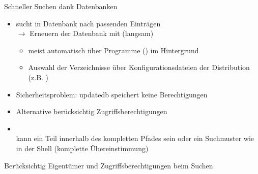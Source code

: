\documentclass[aspectratio=43]{beamer}
\begin{document}
\begin{frame}{Schneller Suchen dank Datenbanken}
  \begin{block}{}
    \begin{itemize}
      \item sucht in Datenbank nach passenden Einträgen\\
        $\rightarrow$ Erneuern der Datenbank mit  (langsam)
        \begin{itemize}
          \item meist automatisch über Programme () im Hintergrund
          \item Auswahl der Verzeichnisse über Konfigurationsdateien der Distribution
          (z.B. )
        \end{itemize}
      \item Sicherheitsproblem: updatedb speichert keine Berechtigungen
      \item Alternative  berücksichtig Zugriffsberechtigungen
      \item {} \\
           kann ein Teil innerhalb des kompletten Pfades sein oder 
          ein Suchmuster wie in der Shell (komplette Übereinstimmung)
    \end{itemize}
  \end{block}
  \begin{block}{}
    Berücksichtig Eigentümer und Zugriffsberechtigungen beim Suchen
  \end{block}
\end{frame}
% 
% 
\end{document}
